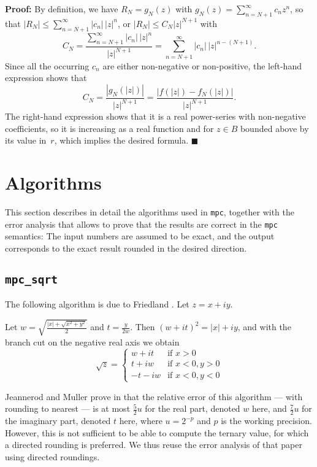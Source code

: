 \documentclass [11pt]{article}
\newcommand {\mpc}{{\tt mpc}}
\renewcommand {\leq}{\leqslant}
\newenvironment{proof}{\noindent \textbf {Proof:}}{{\hspace* {\fill}$\blacksquare$}}
\begin{document}
\begin {proof}
By definition, we have $R_N = g_N (z)$ with
$g_N (z) = \sum_{n = N+1}^\infty c_n z^n$, so that
$|R_N| \leq \sum_{n=N+1}^\infty |c_n| \, |z|^n$,
or
$|R_N| \leq C_N |z|^{N+1}$
with
\[
C_N = \frac {\sum_{n=N+1}^\infty |c_n| \, |z|^n}{|z|^{N+1}}
    = \sum_{n=N+1}^\infty |c_n| \, |z|^{n - (N+1)}.
\]
Since all the occurring $c_n$ are either non-negative or non-positive,
the left-hand expression shows that
\[
C_N = \frac {|g_N (|z|)|}{|z|^{N+1}}
    = \frac {|f (|z|) - f_N (|z|)|}{|z|^{N+1}}.
\]
The right-hand expression shows that it is a real power-series with
non-negative coefficients, so it is increasing as a real function and
for $z \in B$ bounded above by its value in~$r$, which implies the
desired formula.
\end {proof}




\section {Algorithms}
\label {sec:algorithms}

This section describes in detail the algorithms used in \mpc, together with
the error analysis that allows to prove that the results are correct in the
{\mpc} semantics: The input numbers are assumed to be exact, and the output
corresponds to the exact result rounded in the desired direction.


\subsection {\texttt {mpc\_sqrt}}

The following algorithm is due to Friedland \cite{Friedland67,Smith98}.
Let $z = x + i y$.

Let $w = \sqrt { \frac {|x| + \sqrt {x^2 + y^2}}{2}}$ and
$t = \frac {y}{2w}$. Then $(w + it)^2 = |x| + iy$, and with the branch cut on the negative real axis we obtain
\[
\sqrt z = \left\{
\begin {array}{cl}
w + i t & \text {if } x > 0 \\
t + i w & \text {if } x < 0, y > 0 \\
-t - i w & \text {if } x < 0, y < 0
\end {array}
\right.
\]

Jeannerod and Muller prove in \cite{jeannerod:ensl-01780265} that the relative
error of this algorithm --- with rounding to nearest ---
is at most $\frac{5}{2} u$ for the real part, denoted
$w$ here, and
$\frac{7}{2} u$ for the imaginary part, denoted $t$ here,
where $u = 2^{-p}$ and $p$ is the
working precision.
However, this is not sufficient to be able to compute the ternary value,
for which a directed rounding is preferred.
We thus reuse the error analysis of that paper using directed roundings.
\end{document}

